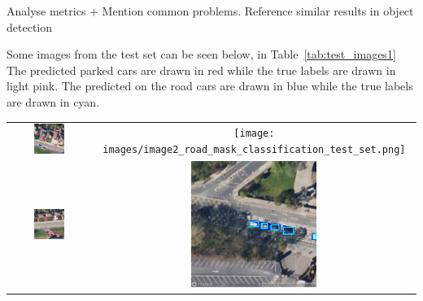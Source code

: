 Analyse metrics + Mention common problems. Reference similar results in object detection

Some images from the test set can be seen below, in Table~\ref{tab:test_images1}
The predicted parked cars are drawn in red while the true labels are drawn in light pink. The predicted on the road cars are drawn in blue while the true labels are drawn in cyan.

\begin{table}[h]
  \centering
  \begin{tabular}{cc}
    \includegraphics[width=0.4\textwidth]{images/image1_road_mask_classification_test_set.png} & \texttt{[image: images/image2\_road\_mask\_classification\_test\_set.png]} \\
    \includegraphics[width=0.4\textwidth]{images/image3_road_mask_classification_test_set.png} & \includegraphics[width=0.4\textwidth]{images/image4_road_mask_classification_test_set.png} \\

\end{tabular}
\end{table}
